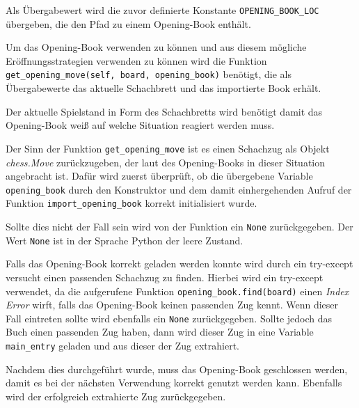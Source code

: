 Als Übergabewert wird die zuvor definierte Konstante
\texttt{OPENING\_BOOK\_LOC} übergeben, die den Pfad zu einem
Opening-Book enthält.

    Um das Opening-Book verwenden zu können und aus diesem mögliche
Eröffnungsstrategien verwenden zu können wird die Funktion
\texttt{get\_opening\_move(self,\ board,\ opening\_book)} benötigt, die
als Übergabewerte das aktuelle Schachbrett und das importierte Book
erhält.

Der aktuelle Spielstand in Form des Schachbretts wird benötigt damit das
Opening-Book weiß auf welche Situation reagiert werden muss.

Der Sinn der Funktion \texttt{get\_opening\_move} ist es einen Schachzug
als Objekt \emph{chess.Move} zurückzugeben, der laut des Opening-Books
in dieser Situation angebracht ist. Dafür wird zuerst überprüft, ob die
übergebene Variable \texttt{opening\_book} durch den Konstruktor und dem
damit einhergehenden Aufruf der Funktion \texttt{import\_opening\_book}
korrekt initialisiert wurde.

Sollte dies nicht der Fall sein wird von der Funktion ein \texttt{None}
zurückgegeben. Der Wert \texttt{None} ist in der Sprache Python der
leere Zustand.

Falls das Opening-Book korrekt geladen werden konnte wird durch ein
try-except versucht einen passenden Schachzug zu finden. Hierbei wird
ein try-except verwendet, da die aufgerufene Funktion
\texttt{opening\_book.find(board)} einen \emph{Index Error} wirft, falls
das Opening-Book keinen passenden Zug kennt. Wenn dieser Fall eintreten
sollte wird ebenfalls ein \texttt{None} zurückgegeben. Sollte jedoch das
Buch einen passenden Zug haben, dann wird dieser Zug in eine Variable
\texttt{main\_entry} geladen und aus dieser der Zug extrahiert.

Nachdem dies durchgeführt wurde, muss das Opening-Book geschlossen
werden, damit es bei der nächsten Verwendung korrekt genutzt werden
kann. Ebenfalls wird der erfolgreich extrahierte Zug zurückgegeben.

